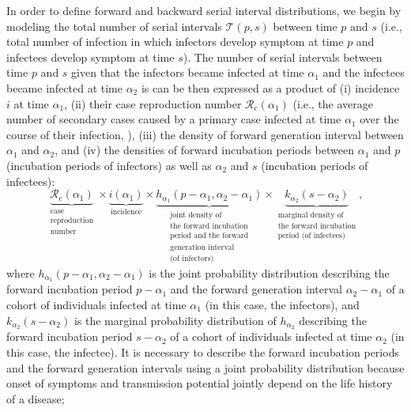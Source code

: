 \documentclass[12pt]{article}
\newcommand{\Rx}[1]{\ensuremath{{\mathcal R}_{#1}}\xspace}
\newcommand{\Rc}{\Rx{\mathrm{c}}}
\newcommand{\pt}{p} %
\newcommand{\st}{s} %
\newcommand{\total}{{\mathcal T}} %
\begin{document}
In order to define forward and backward serial interval distributions, we begin by modeling the total number of serial intervals $\total(\pt,\st)$ between time $\pt$ and $\st$ (i.e., total number of infection in which infectors develop symptom at time $\pt$ and infectees develop symptom at time $\st$).
The number of serial intervals between time $\pt$ and $\st$ given that the infectors became infected at time $\alpha_1$ and the infectees became infected at time $\alpha_2$ is can be then expressed as a product of (i) incidence $i$ at time $\alpha_1$, (ii) their case reproduction number $\Rc(\alpha_1)$ (i.e., the average number of secondary cases caused by a primary case infected at time $\alpha_1$ over the course of their infection, \cite{fraser2007estimating}), (iii) the density of forward generation interval between $\alpha_1$ and $\alpha_2$, and (iv) the densities of forward incubation periods between $\alpha_1$ and $\pt$ (incubation periods of infectors) as well as $\alpha_2$ and $\st$ (incubation periods of infectees):
\begin{equation}
\underbrace{\Rc (\alpha_1)}_{\substack{\text{case} \\ \text{reproduction} \\ \text{number}}} 
\times 
\underbrace{i(\alpha_1)}_{\text{incidence}} 
\times 
\underbrace{h_{\alpha_1}(\pt-\alpha_1, \alpha_2 - \alpha_1)}_{\substack{\text{joint density of} \\ \text{the forward incubation} \\ \text{period and the forward} \\ \text{generation interval}\\ \text{(of infectors)}}}
\times
\underbrace{k_{\alpha_2}(\st - \alpha_2)}_{\substack{\text{marginal density of} \\ \text{the forward incubation} \\ \text{period (of infectees)}}},
\end{equation}
where $h_{\alpha_1}(\pt-\alpha_1, \alpha_2 - \alpha_1)$ is the joint probability distribution describing the forward incubation period $\pt-\alpha_1$ and the forward generation interval $\alpha_2 - \alpha_1$ of a cohort of individuals infected at time $\alpha_1$ (in this case, the infectors), and $k_{\alpha_2}(\st-\alpha_2)$ is the marginal probability distribution of $h_{\alpha_2}$ describing the forward incubation period $\st-\alpha_2$ of a cohort of individuals infected at time $\alpha_2$ (in this case, the infectee).
It is necessary to describe the forward incubation periods and the forward generation intervals using a joint probability distribution because onset of symptoms and transmission potential jointly depend on the life history of a disease;
\end{document}

